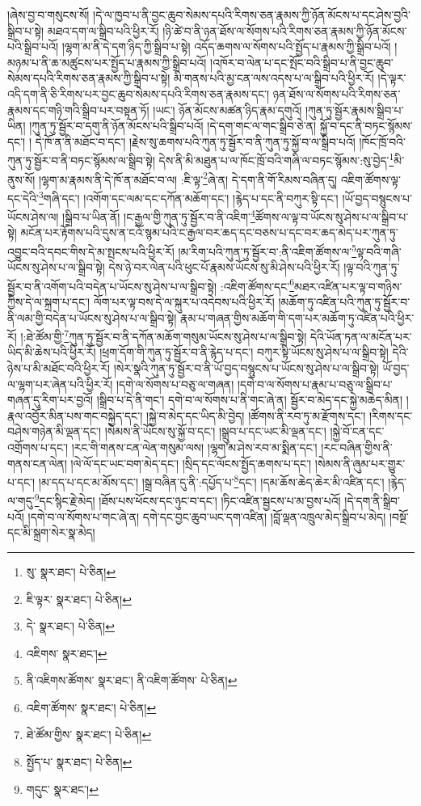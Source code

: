 །ཞེས་བྱ་བ་གསུངས་སོ། །དེ་ལ་ཁྱབ་པ་ནི་བྱང་ཆུབ་སེམས་དཔའི་རིགས་ཅན་རྣམས་ཀྱི་ཉོན་མོངས་པ་དང་ཤེས་བྱའི་སྒྲིབ་པ་སྟེ། མཐའ་དག་ལ་སྒྲིབ་པའི་ཕྱིར་རོ། །ཉི་ཚེ་བ་ནི་ཉན་ཐོས་ལ་སོགས་པའི་རིགས་ཅན་རྣམས་ཀྱི་ཉོན་མོངས་པའི་སྒྲིབ་པའོ། །ལྷག་མ་ནི་དེ་དག་ཉིད་ཀྱི་སྒྲིབ་པ་སྟེ། འདོད་ཆགས་ལ་སོགས་པའི་སྤྱོད་པ་རྣམས་ཀྱི་སྒྲིབ་པའོ། །མཉམ་པ་ནི་ཆ་མཚུངས་པར་སྤྱོད་པ་རྣམས་ཀྱི་སྒྲིབ་པའོ། །འཁོར་བ་ལེན་པ་དང་སྤོང་བའི་སྒྲིབ་པ་ནི་བྱང་ཆུབ་སེམས་དཔའི་རིགས་ཅན་རྣམས་ཀྱི་སྒྲིབ་པ་སྟེ། མི་གནས་པའི་མྱ་ངན་ལས་འདས་པ་ལ་སྒྲིབ་པའི་ཕྱིར་རོ། །དེ་ལྟར་འདི་དག་ནི་ཅི་རིགས་པར་བྱང་ཆུབ་སེམས་དཔའི་རིགས་ཅན་རྣམས་དང་། ཉན་ཐོས་ལ་སོགས་པའི་རིགས་ཅན་རྣམས་དང་གཉི་གའི་སྒྲིབ་པར་བསྟན་ཏོ། །ཡང་། ཉོན་མོངས་མཚན་ཉིད་རྣམ་དགུའོ། །ཀུན་ཏུ་སྦྱོར་རྣམས་སྒྲིབ་པ་ཡིན། །ཀུན་ཏུ་སྦྱོར་བ་དགུ་ནི་ཉོན་མོངས་པའི་སྒྲིབ་པའོ། །དེ་དག་གང་ལ་གང་སྒྲིབ་ཅེ་ན། སྐྱོ་བ་དང་ནི་བཏང་སྙོམས་དང་། །
དེ་ཁོ་ན་ནི་མཐོང་བ་དང་། །རྗེས་སུ་ཆགས་པའི་ཀུན་ཏུ་སྦྱོར་བ་ནི་ཀུན་ཏུ་སྐྱོ་བ་ལ་སྒྲིབ་པའོ། །ཁོང་ཁྲོ་བའི་ཀུན་ཏུ་སྦྱོར་བ་ནི་བཏང་སྙོམས་ལ་སྒྲིབ་སྟེ། དེས་ནི་མི་མཐུན་པ་ལ་ཁོང་ཁྲོ་བའི་གཞི་ལ་བཏང་སྙོམས་:སུ་བྱེད་\footnote{སུ་  སྣར་ཐང་།  པེ་ཅིན། }མི་ནུས་སོ། །ལྷག་མ་རྣམས་ནི་དེ་ཁོ་ན་མཐོང་བ་ལ། :ཇི་ལྟ་\footnote{ཇི་ལྟར་  སྣར་ཐང་།  པེ་ཅིན། }ཞེ་ན། དེ་དག་ནི་གོ་རིམས་བཞིན་དུ། འཇིག་ཚོགས་ལྟ་དང་དེའི་\footnote{དེ་  སྣར་ཐང་།  པེ་ཅིན། }གཞི་དང་། །འགོག་དང་ལམ་དང་དཀོན་མཆོག་དང་། །རྙེད་པ་དང་ནི་བཀུར་སྟི་དང་། །ཡོ་བྱད་བསྙུངས་པ་ཡོངས་ཤེས་ལ། །སྒྲིབ་པ་ཡིན་ནོ། །ང་རྒྱལ་གྱི་ཀུན་ཏུ་སྦྱོར་བ་ནི་འཇིག་\footnote{འཇིགས་  སྣར་ཐང་། }ཚོགས་ལ་ལྟ་བ་ཡོངས་སུ་ཤེས་པ་ལ་སྒྲིབ་པ་སྟེ། མངོན་པར་རྟོགས་པའི་དུས་ན་ངའོ་སྙམ་པའི་ང་རྒྱལ་བར་ཆད་དང་བཅས་པ་དང་བར་ཆད་མེད་པར་ཀུན་ཏུ་འབྱུང་བའི་དབང་གིས་དེ་མ་སྤངས་པའི་ཕྱིར་རོ། །མ་རིག་པའི་ཀུན་ཏུ་སྦྱོར་བ་:ནི་འཇིག་ཚོགས་ལ་\footnote{ནི་འཇིགས་ཚོགས་  སྣར་ཐང་། ནི་འཇིག་ཚོགས་  པེ་ཅིན། }ལྟ་བའི་གཞི་ཡོངས་སུ་ཤེས་པ་ལ་སྒྲིབ་སྟེ། དེས་ཉེ་བར་ལེན་པའི་ཕུང་པོ་རྣམས་ཡོངས་སུ་མི་ཤེས་པའི་ཕྱིར་རོ། །ལྟ་བའི་ཀུན་ཏུ་སྦྱོར་བ་ནི་འགོག་པའི་བདེན་པ་ཡོངས་སུ་ཤེས་པ་ལ་སྒྲིབ་སྟེ། :འཇིག་ཚོགས་དང་\footnote{འཇིག་ཚོགས་  སྣར་ཐང་།  པེ་ཅིན། }མཐར་འཛིན་པར་ལྟ་བ་གཉིས་ཀྱིས་དེ་ལ་སྐྲག་པ་དང་། ལོག་པར་ལྟ་བས་དེ་ལ་སྐུར་པ་འདེབས་པའི་ཕྱིར་རོ། །མཆོག་ཏུ་འཛིན་པའི་ཀུན་ཏུ་སྦྱོར་བ་ནི་ལམ་གྱི་བདེན་པ་ཡོངས་སུ་ཤེས་པ་ལ་སྒྲིབ་སྟེ། རྣམ་པ་གཞན་གྱིས་མཆོག་གི་དག་པར་མཆོག་ཏུ་འཛིན་པའི་ཕྱིར་རོ། །:ཐེ་ཚོམ་གྱི་\footnote{ཐེ་ཚོམ་གྱིས་  སྣར་ཐང་།  པེ་ཅིན། }ཀུན་ཏུ་སྦྱོར་བ་ནི་དཀོན་མཆོག་གསུམ་ཡོངས་སུ་ཤེས་པ་ལ་སྒྲིབ་སྟེ། དེའི་ཡོན་ཏན་ལ་མངོན་པར་ཡིད་མི་ཆེས་པའི་ཕྱིར་རོ། །ཕྲག་དོག་གི་ཀུན་ཏུ་སྦྱོར་བ་ནི་རྙེད་པ་དང་། བཀུར་སྟི་ཡོངས་སུ་ཤེས་པ་ལ་སྒྲིབ་སྟེ། དེའི་ཉེས་པ་མི་མཐོང་བའི་ཕྱིར་རོ། །སེར་སྣའི་ཀུན་ཏུ་སྦྱོར་བ་ནི་ཡོ་བྱད་བསྙུངས་པ་ཡོངས་སུ་ཤེས་པ་ལ་སྒྲིབ་སྟེ། ཡོ་བྱད་ལ་ལྷག་པར་ཞེན་པའི་ཕྱིར་རོ། །དགེ་ལ་སོགས་པ་བཅུ་ལ་གཞན། །དགེ་བ་ལ་སོགས་པ་རྣམ་པ་བཅུ་ལ་སྒྲིབ་པ་གཞན་དུ་རིག་པར་བྱའོ། །སྒྲིབ་པ་དེ་ནི་གང་། དགེ་བ་ལ་སོགས་པ་ནི་གང་ཞེ་ན། སྦྱོར་བ་མེད་དང་སྐྱེ་མཆེད་མིན། །རྣལ་འབྱོར་མིན་པས་གང་བསྐྱེད་དང་། །སྐྱེ་བ་མེད་དང་ཡིད་མི་བྱེད། །ཚོགས་ནི་རབ་ཏུ་མ་རྫོགས་དང་། །རིགས་དང་བཤེས་གཉེན་མི་ལྡན་དང་། །སེམས་ནི་ཡོངས་སུ་སྐྱོ་བ་དང་། །སྒྲུབ་པ་དང་ཡང་མི་ལྡན་དང་། །སྐྱེ་བོ་ངན་དང་འགྲོགས་པ་དང་། །རང་གི་གནས་ངན་ལེན་གསུམ་ལས། །ལྷག་མ་ཤེས་རབ་མ་སྨིན་དང་། །རང་བཞིན་གྱིས་ནི་གནས་ངན་ལེན། །ལེ་ལོ་དང་ཡང་བག་མེད་དང་། །སྲིད་དང་ལོངས་སྤྱོད་ཆགས་པ་དང་། །སེམས་ནི་ཞུམ་པར་གྱུར་པ་དང་། །མ་དད་པ་དང་མ་མོས་དང་། །སྒྲ་བཞིན་དུ་ནི་:དཔྱོད་པ་\footnote{སྤྱོད་པ་  སྣར་ཐང་།  པེ་ཅིན། }དང་། །དམ་ཆོས་ཆེད་ཆེར་མི་འཛིན་དང་། །རྙེད་ལ་གདུ་\footnote{གདུང་  སྣར་ཐང་། }དང་སྙིང་རྗེ་མེད། །ཐོས་པས་ཕོངས་དང་ཉུང་བ་དང་། །ཏིང་འཛིན་སྦྱངས་པ་མ་བྱས་པའོ། །དེ་དག་ནི་སྒྲིབ་པའོ། །དགེ་བ་ལ་སོགས་པ་གང་ཞེ་ན། དགེ་དང་བྱང་ཆུབ་ཡང་དག་འཛིན། །བློ་ལྡན་འཁྲུལ་མེད་སྒྲིབ་པ་མེད། །བསྔོ་དང་མི་སྐྲག་སེར་སྣ་མེད། 